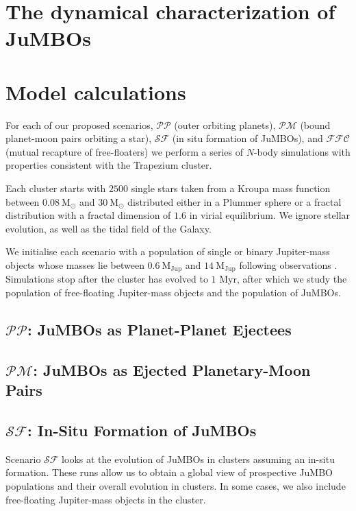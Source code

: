 \documentclass[aa]{aa}
\begin{document}
\section{The dynamical characterization of JuMBOs}

\section{Model calculations} 
    For each of our proposed scenarios, $\mathcal{PP}$ (outer orbiting planets), $\mathcal{PM}$ (bound planet-moon pairs orbiting a star),  $\mathcal{SF}$ (in situ formation of JuMBOs), and $\mathcal{FFC}$ (mutual recapture of free-floaters) we perform a series of $N$-body simulations with properties consistent with the Trapezium cluster. 
    
    Each cluster starts with  $2500$  single stars taken from a Kroupa mass function \citep{2002MNRAS.336.1188K} between $0.08\ \mathrm{M}_\odot$ and $30\ \mathrm{M}_\odot$ distributed either in a Plummer sphere or a fractal distribution with a fractal dimension of $1.6$ in virial equilibrium. We ignore stellar evolution, as well as the tidal field of the Galaxy.
    
    We initialise each scenario with a population of single or binary Jupiter-mass objects whose masses lie between $0.6\ \mathrm{M}_{\mathrm{Jup}}$ and $14\ \mathrm{M}_{\mathrm{Jup}}$ following observations \citep{2023arXiv231001231P}. Simulations stop after the cluster has evolved to $1$ Myr, after which we study the population of free-floating Jupiter-mass objects and the population of JuMBOs.

    \subsection{$\mathcal{PP}$: JuMBOs as Planet-Planet Ejectees}
    \subsection{$\mathcal{PM}$: JuMBOs as Ejected Planetary-Moon Pairs}
    
    \subsection{$\mathcal{SF}$: In-Situ Formation of JuMBOs}\label{Sec:SF_Method}
    Scenario $\mathcal{SF}$ looks at the evolution of JuMBOs in clusters assuming an in-situ formation. These runs allow us to obtain a global view of prospective JuMBO populations and their overall evolution in clusters. In some cases, we also include free-floating Jupiter-mass objects in the cluster. 
    
\end{document}
